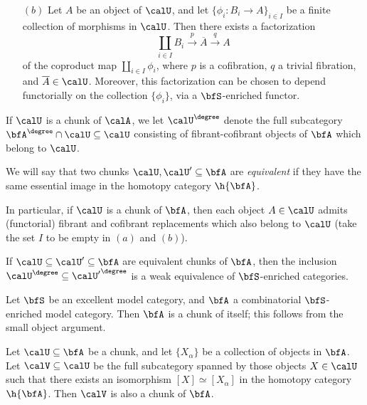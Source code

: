 \begin{Simplicial Categories}
\begin{definition}
\begin{itemize}
\item[$(b)$] Let $A$ be an object of $\calU$, and let $\{ \phi_i: B_i \rightarrow A \}_{i \in I}$ be a finite
collection of morphisms in $\calU$. Then there exists a factorization
$$ \coprod_{i \in I} B_i \stackrel{p}{\rightarrow} \overline{A} \stackrel{q}{\rightarrow} A$$
of the coproduct map $\coprod_{i \in I} \phi_i$,
where $p$ is a cofibration, $q$ a trivial fibration, and $\overline{A} \in \calU$.
Moreover, this factorization can be chosen to depend functorially on the collection
$\{ \phi_i \}$, via a $\bfS$-enriched functor.
\end{itemize}

If $\calU$ is a chunk of $\calA$, we let $\calU^{\degree}$
denote the full subcategory $\bfA^{\degree} \cap \calU \subseteq \calU$ consisting
of fibrant-cofibrant objects of $\bfA$ which belong to $\calU$.

We will say that two chunks $\calU, \calU' \subseteq \bfA$ are {\it equivalent} if
they have the same essential image in the homotopy category $\h{\bfA}$.
\end{definition}

\begin{remark}
In particular, if $\calU$ is a chunk of $\bfA$, then each object $A \in \calU$ admits (functorial)
fibrant and cofibrant replacements which also belong to $\calU$ (take the set $I$ to be empty in
$(a)$ and $(b)$). 
\end{remark}

\begin{remark}
If $\calU \subseteq \calU' \subseteq \bfA$ are equivalent chunks of $\bfA$, then
the inclusion $\calU^{\degree} \subseteq {\calU'}^{\degree}$ is a weak equivalence
of $\bfS$-enriched categories.
\end{remark}

\begin{example}
Let $\bfS$ be an excellent model category, and $\bfA$ a combinatorial $\bfS$-enriched model category.
Then $\bfA$ is a chunk of itself; this follows from the small object argument.
\end{example}

\begin{example}
Let $\calU \subseteq \bfA$ be a chunk, and let $\{ X_{\alpha} \}$ be a collection of objects in $\bfA$.
Let $\calV \subseteq \calU$ be the full subcategory spanned by those objects $X \in \calU$
such that there exists an isomorphism $[X] \simeq [X_{\alpha}]$ in the homotopy category
$\h{\bfA}$. Then $\calV$ is also a chunk of $\bfA$.
\end{example}


\end{Simplicial Categories}
